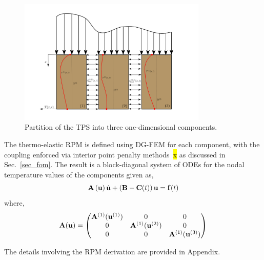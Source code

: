 \begin{figure}
    \centering
    \includegraphics[width=0.8\textwidth]{./figs/three_components.png}
    \caption{Partition of the TPS into three one-dimensional components.}
    \label{fig_domain_partition}
\end{figure}

The thermo-elastic RPM is defined using DG-FEM for each component, with the coupling enforced via interior point penalty methods~\hl{x} as discussed in Sec.~\ref{sec_fom}. The result is a block-diagonal system of ODEs for the nodal temperature values of the components given as,
\begin{equation}
    \mathbf{A}\left(\mathbf{u}\right)\dot{\mathbf{u}} + \left(\mathbf{B} - \mathbf{C}(t)\right)\mathbf{u} = \mathbf{f}(t)\label{eqn_rpm}
\end{equation}
where,
\begin{subequations}
    \begin{align}
        \mathbf{A}(\mathbf{u}) = \begin{pmatrix}
            \mathbf{A}^{(1)}(\mathbf{u}^{(1)}) & 0 & 0 \\
            0 & \mathbf{A}^{(1)}(\mathbf{u}^{(2)}) & 0 \\
            0 & 0 & \mathbf{A}^{(1)}(\mathbf{u}^{(3)}) \\
        \end{pmatrix}
    \end{align}
\end{subequations}

The details involving the RPM derivation are provided in Appendix.

